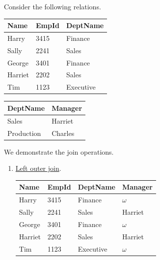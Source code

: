     \begin{example}
      \label{ex:outer-join}
      Consider the following relations. 

      \begin{center}
        \begin{minipage}{0.5\textwidth}
          \centering
          \begin{tabular}{|l|l|l|}
          \hline
          Name & EmpId & DeptName \\
          \hline
          Harry & 3415 & Finance \\
          Sally & 2241 & Sales \\
          George & 3401 & Finance \\
          Harriet & 2202 & Sales \\
          Tim & 1123 & Executive \\
          \hline
          \end{tabular}
        \end{minipage}%
        \begin{minipage}{0.5\textwidth}
          \centering
          \begin{tabular}{|l|l|}
          \hline
          DeptName & Manager \\
          \hline
          Sales & Harriet \\
          Production & Charles \\
          \hline
          \end{tabular}
        \end{minipage}
      \end{center}

      We demonstrate the join operations. 
      \begin{enumerate}
        \item \hyperref[def:left-outer-join]{Left outer join}. 
        \begin{center}
          \begin{tabular}{|l|l|l|l|}
          \hline
          Name & EmpId & DeptName & Manager \\
          \hline
          Harry & 3415 & Finance & $\omega$ \\
          Sally & 2241 & Sales & Harriet \\
          George & 3401 & Finance & $\omega$ \\
          Harriet & 2202 & Sales & Harriet \\
          Tim & 1123 & Executive & $\omega$ \\
          \hline
          \end{tabular}
        \end{center}


\end{enumerate}
\end{example}
